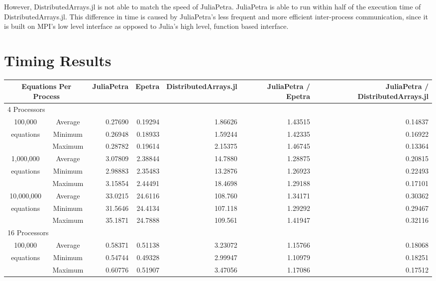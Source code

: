 \documentclass[acmsmall]{acmart}
\begin{document}
However, DistributedArrays.jl is not able to match the speed of JuliaPetra.
JuliaPetra is able to run within half of the execution time of DistributedArrays.jl.
This difference in time is caused by JuliaPetra's less frequent and more efficient inter-process communication,
since it is built on MPI's low level interface as opposed to Julia's high level, function based interface.

\section{Timing Results}

\begin{table}
\begin{tabular}{|c c|r|r|r||r|r|}
	\hline
		\multicolumn{2}{|c|}{Equations Per Process}
		& JuliaPetra
		& Epetra
		& \multicolumn{1}{m{1.8cm}||}{Distributed\-Arrays.jl}
		& \multicolumn{1}{m{1.75cm}|}{JuliaPetra / Epetra}
		& \multicolumn{1}{m{1.8cm}|}{JuliaPetra / Distributed\-Arrays.jl} \\
	\hline
		\multicolumn{7}{|l|}{4 Processors}\\
	\hline
		100,000			&Average & 0.27690 & 0.19294 & 1.86626 & 1.43515 & 0.14837 \\
		equations		&Minimum & 0.26948 & 0.18933 & 1.59244 & 1.42335 & 0.16922 \\
						&Maximum & 0.28782 & 0.19614 & 2.15375 & 1.46745 & 0.13364 \\
	\hline
		1,000,000		&Average & 3.07809 & 2.38844 & 14.7880 & 1.28875 & 0.20815 \\
		equations		&Minimum & 2.98883 & 2.35483 & 13.2876 & 1.26923 & 0.22493 \\
						&Maximum & 3.15854 & 2.44491 & 18.4698 & 1.29188 & 0.17101 \\
	\hline
		10,000,000		&Average & 33.0215 & 24.6116 & 108.760 & 1.34171 & 0.30362 \\
		equations		&Minimum & 31.5646 & 24.4134 & 107.118 & 1.29292 & 0.29467 \\
						&Maximum & 35.1871 & 24.7888 & 109.561 & 1.41947 & 0.32116 \\
	\hline
		\multicolumn{7}{|l|}{16 Processors}\\
	\hline
		100,000			&Average & 0.58371 & 0.51138 & 3.23072 & 1.15766 & 0.18068 \\
		equations		&Minimum & 0.54744 & 0.49328 & 2.99947 & 1.10979 & 0.18251 \\
						&Maximum & 0.60776 & 0.51907 & 3.47056 & 1.17086 & 0.17512 \\

\end{tabular}
\end{table}
\end{document}
